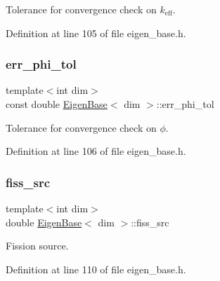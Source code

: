 Tolerance for convergence check on $k_\mathrm{eff}$. 



Definition at line 105 of file eigen\+\_\+base.\+h.

\mbox{\label{class_eigen_base_acc8e2b79484a329d746a55ba656feead}} 
\subsubsection{\texorpdfstring{err\+\_\+phi\+\_\+tol}{err\_phi\_tol}}
{\footnotesize\ttfamily template$<$int dim$>$ \\
const double \hyperlink{class_eigen_base}{Eigen\+Base}$<$ dim $>$\+::err\+\_\+phi\+\_\+tol\hspace{0.3cm}{\ttfamily [protected]}}



Tolerance for convergence check on $\phi$. 



Definition at line 106 of file eigen\+\_\+base.\+h.

\mbox{\label{class_eigen_base_a6fa0753510038439c30de5c1832e4ebc}} 
\subsubsection{\texorpdfstring{fiss\+\_\+src}{fiss\_src}}
{\footnotesize\ttfamily template$<$int dim$>$ \\
double \hyperlink{class_eigen_base}{Eigen\+Base}$<$ dim $>$\+::fiss\+\_\+src\hspace{0.3cm}{\ttfamily [protected]}}



Fission source. 



Definition at line 110 of file eigen\+\_\+base.\+h.

\mbox{\label{class_eigen_base_aa324e40bd20edd51659416da3220d295}} 
